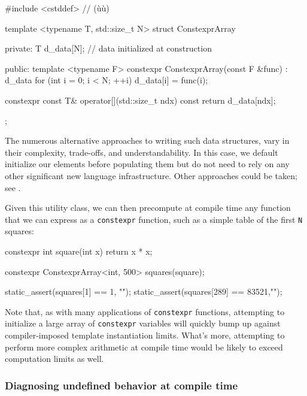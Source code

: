 \begin{emcppshiddenlisting}[emcppsbatch=e3,emcppsstandards={c++14}]
#include <cstddef>  // (ù{}ù)
\end{emcppshiddenlisting}
\begin{emcppslisting}[emcppsbatch=e3]
template <typename T, std::size_t N>
struct ConstexprArray
{
private:
    T d_data[N];  // data initialized at construction

public:
    template <typename F>
    constexpr ConstexprArray(const F &func)
    : d_data{}
    {
        for (int i = 0; i < N; ++i)
        {
            d_data[i] = func(i);
        }
    }

    constexpr const T& operator[](std::size_t ndx) const
    {
        return d_data[ndx];
    }
};
\end{emcppslisting}
    
\noindent The numerous alternative approaches to writing such data structures,
vary in their complexity, trade-offs, and understandability. In this
case, we default initialize our elements before populating them but do
not need to rely on any other significant new language infrastructure.
Other approaches could be taken; see .

Given this utility class, we can then precompute at compile time any
function that we can express as a \lstinline!constexpr! function, such as a
simple table of the first \lstinline!N! squares:

\begin{emcppslisting}[emcppsbatch=e3]
constexpr int square(int x) { return x * x; }

constexpr ConstexprArray<int, 500> squares(square);

static_assert(squares[1]   == 1,    "");
static_assert(squares[289] == 83521,"");
\end{emcppslisting}
    
\noindent Note that, as with many applications of \lstinline!constexpr! functions,
attempting to initialize a large array of \lstinline!constexpr! variables
will quickly bump up against compiler-imposed template instantiation
limits. What's more, attempting to perform more complex arithmetic at
compile time would be likely to exceed computation limits as well.

\subsubsection[Diagnosing undefined behavior at compile time]{Diagnosing undefined behavior at compile time}\label{diagnosing-undefined-behavior-at-compile-time}

